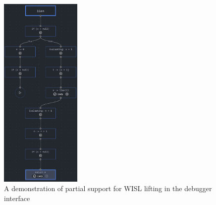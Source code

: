 \begin{figure}
  \centering
  \includegraphics[width=0.35\textwidth]{img/execmap-wisl.png}
  \caption{A demonstration of partial support for WISL lifting in the debugger
  interface}%
  \label{fig:execmap-wisl}
\end{figure}
